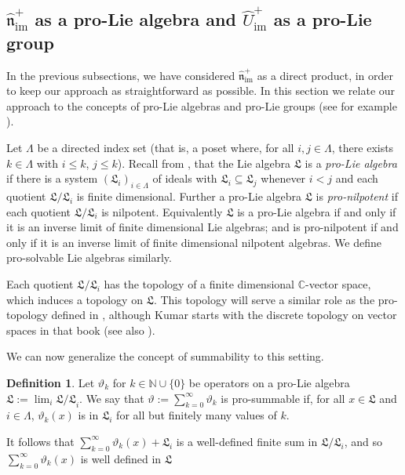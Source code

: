 \documentclass[11pt,letterpaper]{amsart}
\newcounter{thecounter}
\numberwithin{thecounter}{section}
\theoremstyle{definition}
\newtheorem{defn}[thecounter]{Definition}
\DeclareMathOperator{\im}{{im}}
\newcommand{\C}{{\mathbb C}}
\newcommand{\N}{{\mathbb N}}
\newcommand{\nhimp}{{\widehat{\mathfrak{n}}_{\im}^+}}
\begin{document}
\subsection{$\nhimp$ as a pro-Lie algebra and $\widehat{U}_{\im}^+$ as a pro-Lie group}\label{SS-pro}
In the previous subsections, we have considered $\nhimp$ as a direct product, in order to keep our approach as straightforward as possible.
In this section we relate our approach to the concepts of pro-Lie algebras and pro-Lie groups (see for example \cite{kumar2012kac}).

Let $\Lambda$ be a directed index set (that is, a poset where, for all $i,j\in\Lambda$, there exists $k\in\Lambda$ with $i\le k$, $j\le k$).
Recall from \cite{kumar2012kac}, that the Lie algebra $\mathfrak{L}$ is a \emph{pro-Lie algebra} if there is a system $(\mathfrak{L}_i)_{i\in \Lambda}$ of ideals with $\mathfrak{L}_i\subseteq \mathfrak{L}_j$ whenever $i<j$ and each quotient $\mathfrak{L}/\mathfrak{L}_i$ is finite dimensional.
Further a pro-Lie algebra $\mathfrak{L}$ is \emph{pro-nilpotent} if each quotient $\mathfrak{L}/\mathfrak{L}_i$ is nilpotent.
Equivalently  $\mathfrak{L}$ is a pro-Lie algebra if and only if it is an inverse limit of finite dimensional Lie algebras; and is pro-nilpotent if and only if it is an inverse limit of finite dimensional nilpotent algebras.
We define pro-solvable Lie algebras similarly.

Each quotient $\mathfrak{L}/\mathfrak{L}_i$ has the topology of a finite dimensional $\C$-vector space, which induces a topology on 
$\mathfrak{L}$. 
This topology will serve a similar role as the pro-topology defined in \cite{kumar2012kac}, although Kumar starts with the discrete topology on vector spaces
in that book (see also
\cite{rousseau2012almost}).


We can now generalize the concept of summability \cite{LL} to this setting.
\begin{defn}
Let $\vartheta_k$ for $k\in\N\cup\{0\}$ be operators on a pro-Lie algebra 
$\mathfrak{L} := \lim_i \mathfrak{L/L}_i$. 
We say that $\vartheta:=\sum_{k=0}^\infty \vartheta_k$ is pro-summable if, for all $x\in \mathfrak{L}$ and $i\in\Lambda$,
$\vartheta_k(x)$ is in $\mathfrak{L}_i$ for all but finitely many values of $k$.
\end{defn}
It follows that $\sum_{k=0}^\infty\vartheta_k(x)+\mathfrak{L}_i$ is a well-defined finite sum in $\mathfrak{L}/\mathfrak{L}_i$, and so $\sum_{k=0}^\infty\vartheta_k(x)$ is well defined in $\mathfrak{L}$
\end{document}
